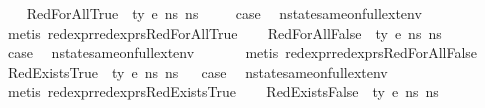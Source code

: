 \begin{isabellebody}
\isamarkupfalse%
\isanewline
\ \ \isamarkupfalse%
\ {\isacharparenleft}{\kern0pt}RedForAllTrue\ {\isasymOmega}\ ty\ e\ ns{}\ ns{}{\isacharparenright}{\kern0pt}\ \isanewline
\ \ \isamarkupfalse%
\ {\isacharquery}{\kern0pt}case\ \isamarkupfalse%
\ nstate{\isacharunderscore}{\kern0pt}same{\isacharunderscore}{\kern0pt}on{\isacharunderscore}{\kern0pt}full{\isacharunderscore}{\kern0pt}ext{\isacharunderscore}{\kern0pt}env\isanewline
\ \ \ \ \isamarkupfalse%
\ {\isacharparenleft}{\kern0pt}metis\ red{\isacharunderscore}{\kern0pt}expr{\isacharunderscore}{\kern0pt}red{\isacharunderscore}{\kern0pt}exprs{\isachardot}{\kern0pt}RedForAllTrue{\isacharparenright}{\kern0pt}\isanewline
{}\isamarkupfalse%
\isanewline
\ \ \isamarkupfalse%
\ {\isacharparenleft}{\kern0pt}RedForAllFalse\ {\isasymOmega}\ ty\ e\ ns{}\ ns{}{\isacharparenright}{\kern0pt}\isanewline
\ \ \ \isamarkupfalse%
\ {\isacharquery}{\kern0pt}case\ \isamarkupfalse%
\ nstate{\isacharunderscore}{\kern0pt}same{\isacharunderscore}{\kern0pt}on{\isacharunderscore}{\kern0pt}full{\isacharunderscore}{\kern0pt}ext{\isacharunderscore}{\kern0pt}env\isanewline
\ \ \ \ \ \isamarkupfalse%
\ {\isacharparenleft}{\kern0pt}metis\ red{\isacharunderscore}{\kern0pt}expr{\isacharunderscore}{\kern0pt}red{\isacharunderscore}{\kern0pt}exprs{\isachardot}{\kern0pt}RedForAllFalse{\isacharparenright}{\kern0pt}\ \isanewline
{}\isamarkupfalse%
\isanewline
\ \isamarkupfalse%
\ {\isacharparenleft}{\kern0pt}RedExistsTrue\ {\isasymOmega}\ ty\ e\ ns{}\ ns{}{\isacharparenright}{\kern0pt}\isanewline
\ \isamarkupfalse%
\ {\isacharquery}{\kern0pt}case\ \isamarkupfalse%
\ nstate{\isacharunderscore}{\kern0pt}same{\isacharunderscore}{\kern0pt}on{\isacharunderscore}{\kern0pt}full{\isacharunderscore}{\kern0pt}ext{\isacharunderscore}{\kern0pt}env\isanewline
\ \ \ \isamarkupfalse%
\ {\isacharparenleft}{\kern0pt}metis\ red{\isacharunderscore}{\kern0pt}expr{\isacharunderscore}{\kern0pt}red{\isacharunderscore}{\kern0pt}exprs{\isachardot}{\kern0pt}RedExistsTrue{\isacharparenright}{\kern0pt}\ \isanewline
{}\isamarkupfalse%
\isanewline
\ \isamarkupfalse%
\ {\isacharparenleft}{\kern0pt}RedExistsFalse\ {\isasymOmega}\ ty\ e\ ns{}\ ns{}{\isacharparenright}{\kern0pt}\isanewline

\end{isabellebody}
